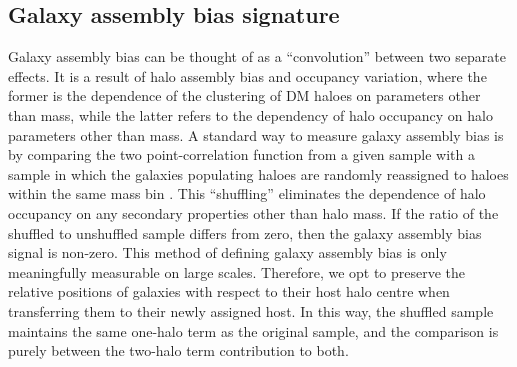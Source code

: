 \documentclass[fleqn,usenatbib]{mnras}
\newcommand{\rss}[1]{\textcolor{purple}{(rss: #1)}}
\begin{document}

\subsection{Galaxy assembly bias signature}
\label{sec:gab}
Galaxy assembly bias can be thought of as a ``convolution'' between two separate effects. It is a result of halo assembly bias and occupancy variation, where the former is the dependence of the clustering of DM haloes on parameters other than mass,  %
while the latter refers to the dependency of halo occupancy on halo parameters other than mass. A standard way to measure galaxy assembly bias is by comparing the two point-correlation function from a given sample with a sample in which the galaxies populating haloes are randomly reassigned to haloes within the same mass bin \citep{2007MNRAS.374.1303C}. This ``shuffling'' eliminates the dependence of halo occupancy on any secondary properties other than halo mass. If the ratio of the shuffled to unshuffled sample differs from zero, then the galaxy assembly bias signal is non-zero. This method of defining galaxy assembly bias is only meaningfully measurable on large scales. Therefore, we opt to preserve the relative positions of galaxies with respect to their host halo centre when transferring them to their newly assigned host. In this way, the shuffled sample maintains the same one-halo term as the original sample, and the comparison is purely between the two-halo term contribution to both.
\end{document}
